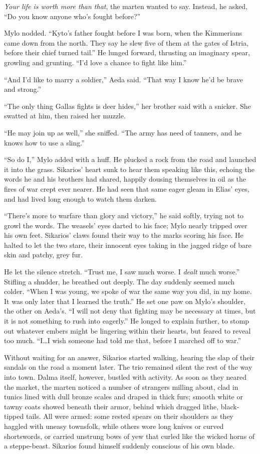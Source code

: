 \emph{Your life is worth more than that}, the marten wanted to say. Instead, he asked, ``Do you know anyone who's fought before?''

Mylo nodded. ``Kyto's father fought before I was born, when the Kimmerians came down from the north. They say he slew five of them at the gates of Istria, before their chief turned tail.'' He lunged forward, thrusting an imaginary spear, growling and grunting. ``I'd love a chance to fight like him.''

``And I'd like to marry a soldier,'' Aeda said. ``That way I know he'd be brave and strong.''

``The only thing Gallas fights is deer hides,'' her brother said with a snicker. She swatted at him, then raised her muzzle.

``He may join up as well,'' she sniffed. ``The army has need of tanners, and he knows how to use a sling.''

``So do I,'' Mylo added with a huff. He plucked a rock from the road and launched it into the grass. Sikarios' heart sunk to hear them speaking like this, echoing the words he and his brothers had shared, happily dousing themselves in oil as the fires of war crept ever nearer. He had seen that same eager gleam in Elias' eyes, and had lived long enough to watch them darken.

``There's more to warfare than glory and victory,'' he said softly, trying not to growl the words. The weasels' eyes darted to his face; Mylo nearly tripped over his own feet. Sikarios' claws found their way to the marks scoring his face. He halted to let the two stare, their innocent eyes taking in the jagged ridge of bare skin and patchy, grey fur.

He let the silence stretch. ``Trust me, I saw much worse. I \emph{dealt} much worse.'' Stifling a shudder, he breathed out deeply. The day suddenly seemed much colder. ``When I was young, we spoke of war the same way you did, in my home. It was only later that I learned the truth.'' He set one paw on Mylo's shoulder, the other on Aeda's. ``I will not deny that fighting may be necessary at times, but it is not something to rush into eagerly.'' He longed to explain further, to stomp out whatever embers might be lingering within their hearts, but feared to reveal too much. ``I\ldots{}I wish someone had told me that, before I marched off to war.''

Without waiting for an answer, Sikarios started walking, hearing the slap of their sandals on the road a moment later. The trio remained silent the rest of the way into town. Dalma itself, however, bustled with activity. As soon as they neared the market, the marten noticed a number of strangers milling about, clad in tunics lined with dull bronze scales and draped in thick furs; smooth white or tawny coats showed beneath their armor, behind which dragged lithe, black-tipped tails. All were armed: some rested spears on their shoulders as they haggled with uneasy townsfolk, while others wore long knives or curved shortswords, or carried unstrung bows of yew that curled like the wicked horns of a steppe-beast. Sikarios found himself suddenly conscious of his own blade.

